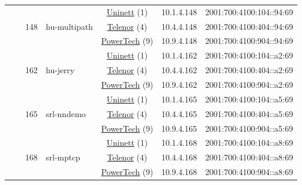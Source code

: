 \begin{small}
\begin{center}
\begin{longtable}{|c|c|c|c|c|c|c|c|}
  &  & \multirow{3}{*}{\tiny{148}} & \multicolumn{1}{|l|}{\multirow{3}{*}{\tiny{hu-multipath}}} & \multicolumn{2}{|c|}{\tiny{\href{https://www.uninett.no}{Uninett} (1)}} & \tiny{10.1.4.148} & \tiny{2001:700:4100:104::94:69} \\* \cline{5-5}\cline{6-6}\cline{7-7}\cline{8-8}
  &  &  &  & \multicolumn{2}{|c|}{\tiny{\href{https://www.telenor.no}{Telenor} (4)}} & \tiny{10.4.4.148} & \tiny{2001:700:4100:404::94:69} \\* \cline{5-5}\cline{6-6}\cline{7-7}\cline{8-8}
  &  &  &  & \multicolumn{2}{|c|}{\tiny{\href{http://www.powertech.no}{PowerTech} (9)}} & \tiny{10.9.4.148} & \tiny{2001:700:4100:904::94:69} \\* \cline{3-3}\cline{4-4}\cline{5-5}\cline{6-6}\cline{7-7}\cline{8-8}
  &  & \multirow{3}{*}{\tiny{162}} & \multicolumn{1}{|l|}{\multirow{3}{*}{\tiny{hu-jerry}}} & \multicolumn{2}{|c|}{\tiny{\href{https://www.uninett.no}{Uninett} (1)}} & \tiny{10.1.4.162} & \tiny{2001:700:4100:104::a2:69} \\* \cline{5-5}\cline{6-6}\cline{7-7}\cline{8-8}
  &  &  &  & \multicolumn{2}{|c|}{\tiny{\href{https://www.telenor.no}{Telenor} (4)}} & \tiny{10.4.4.162} & \tiny{2001:700:4100:404::a2:69} \\* \cline{5-5}\cline{6-6}\cline{7-7}\cline{8-8}
  &  &  &  & \multicolumn{2}{|c|}{\tiny{\href{http://www.powertech.no}{PowerTech} (9)}} & \tiny{10.9.4.162} & \tiny{2001:700:4100:904::a2:69} \\* \cline{3-3}\cline{4-4}\cline{5-5}\cline{6-6}\cline{7-7}\cline{8-8}
  &  & \multirow{3}{*}{\tiny{165}} & \multicolumn{1}{|l|}{\multirow{3}{*}{\tiny{srl-nndemo}}} & \multicolumn{2}{|c|}{\tiny{\href{https://www.uninett.no}{Uninett} (1)}} & \tiny{10.1.4.165} & \tiny{2001:700:4100:104::a5:69} \\* \cline{5-5}\cline{6-6}\cline{7-7}\cline{8-8}
  &  &  &  & \multicolumn{2}{|c|}{\tiny{\href{https://www.telenor.no}{Telenor} (4)}} & \tiny{10.4.4.165} & \tiny{2001:700:4100:404::a5:69} \\* \cline{5-5}\cline{6-6}\cline{7-7}\cline{8-8}
  &  &  &  & \multicolumn{2}{|c|}{\tiny{\href{http://www.powertech.no}{PowerTech} (9)}} & \tiny{10.9.4.165} & \tiny{2001:700:4100:904::a5:69} \\* \cline{3-3}\cline{4-4}\cline{5-5}\cline{6-6}\cline{7-7}\cline{8-8}
  &  & \multirow{3}{*}{\tiny{168}} & \multicolumn{1}{|l|}{\multirow{3}{*}{\tiny{srl-mptcp}}} & \multicolumn{2}{|c|}{\tiny{\href{https://www.uninett.no}{Uninett} (1)}} & \tiny{10.1.4.168} & \tiny{2001:700:4100:104::a8:69} \\* \cline{5-5}\cline{6-6}\cline{7-7}\cline{8-8}
  &  &  &  & \multicolumn{2}{|c|}{\tiny{\href{https://www.telenor.no}{Telenor} (4)}} & \tiny{10.4.4.168} & \tiny{2001:700:4100:404::a8:69} \\* \cline{5-5}\cline{6-6}\cline{7-7}\cline{8-8}
  &  &  &  & \multicolumn{2}{|c|}{\tiny{\href{http://www.powertech.no}{PowerTech} (9)}} & \tiny{10.9.4.168} & \tiny{2001:700:4100:904::a8:69} \\ \hline
\end{longtable}
\end{center}
\end{small}
